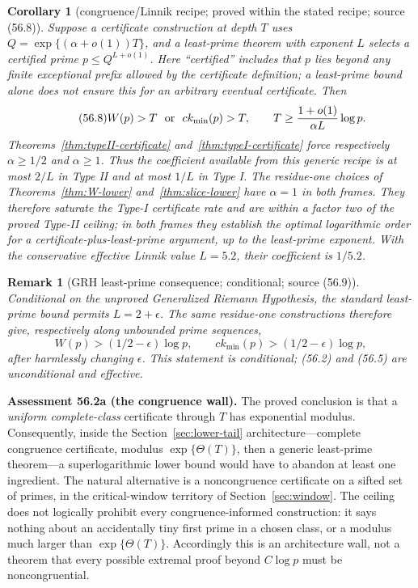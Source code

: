 \documentclass[10pt,reqno]{amsart}
\newtheorem{corollary}[theorem]{Corollary}
\newtheorem{remark}[theorem]{Remark}
\theoremstyle{definition}
\newcommand{\1}{\mathbf 1}
\begin{document}
\begin{corollary}[congruence/Linnik recipe; proved within the stated recipe;
source (56.8)]\label{cor:certificate-Linnik}
Suppose a certificate construction at depth $T$ uses
$Q=\exp\{(\alpha+o(1))T\}$, and a least-prime theorem with exponent $L$
selects a certified prime $p\leq Q^{L+o(1)}$.  Here ``certified'' includes
that $p$ lies beyond any finite exceptional prefix allowed by the
certificate definition; a least-prime bound alone does not ensure this for
an arbitrary eventual certificate.  Then
\begin{equation}\tag{56.8}
 W(p)>T\ \hbox{ or }\ ck_{\min}(p)>T,
 \qquad T\geq\frac{1+o(1)}{\alpha L}\log p.
\end{equation}
Theorems~\ref{thm:typeII-certificate} and~\ref{thm:typeI-certificate} force
respectively $\alpha\geq1/2$ and $\alpha\geq1$.  Thus the coefficient
available from this generic recipe is at most $2/L$ in Type II and at most
$1/L$ in Type I.  The residue-one choices of
Theorems~\ref{thm:W-lower} and~\ref{thm:slice-lower} have $\alpha=1$ in
both frames.  They therefore saturate the Type-I certificate rate and are
within a factor two of the proved Type-II ceiling; in both frames they
establish the optimal logarithmic order for a
certificate-plus-least-prime argument, up to the least-prime exponent.
With the conservative effective Linnik value $L=5.2$, their coefficient is
$1/5.2$.
\end{corollary}

\begin{remark}[GRH least-prime consequence; conditional; source (56.9)]
\label{rem:GRH-certificate}
Conditional on the unproved Generalized Riemann Hypothesis, the standard
least-prime bound permits $L=2+\epsilon$.  The same residue-one
constructions therefore give, respectively along unbounded prime sequences,
\begin{equation}\tag{56.9}
 W(p)> (1/2-\epsilon)\log p,
 \qquad ck_{\min}(p)> (1/2-\epsilon)\log p,
\end{equation}
after harmlessly changing $\epsilon$.  This statement is conditional;
(56.2) and (56.5) are unconditional and effective.
\end{remark}

\medskip\noindent\textbf{Assessment 56.2a (the congruence wall).}
The proved conclusion is that a \emph{uniform complete-class} certificate
through $T$ has exponential modulus.  Consequently, inside the
Section~\ref{sec:lower-tail} architecture---complete congruence certificate,
modulus $\exp\{\Theta(T)\}$, then a generic least-prime theorem---a
superlogarithmic lower bound would have to abandon at least one ingredient.
The natural alternative is a noncongruence certificate on a sifted set of
primes, in the critical-window territory of Section~\ref{sec:window}.  The
ceiling does not logically prohibit every congruence-informed construction:
it says nothing about an accidentally tiny first prime in a chosen class,
or a modulus much larger than $\exp\{\Theta(T)\}$.  Accordingly this is an
architecture wall, not a theorem that every possible extremal proof beyond
$C\log p$ must be noncongruential.
\end{document}
